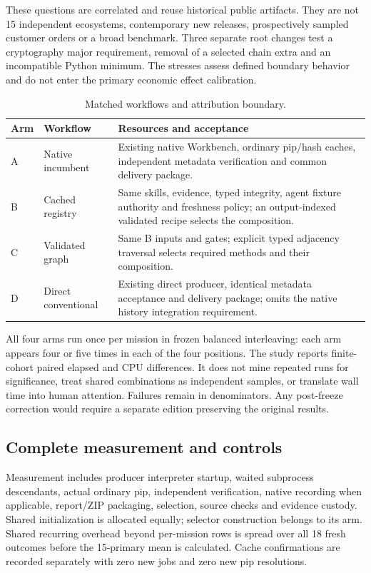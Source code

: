 \documentclass[11pt,a4paper]{article}
\begin{document}
These questions are correlated and reuse historical public artifacts. They are not 15 independent ecosystems, contemporary new releases, prospectively sampled customer orders or a broad benchmark. Three separate root changes test a cryptography major requirement, removal of a selected chain extra and an incompatible Python minimum. The stresses assess defined boundary behavior and do not enter the primary economic effect calibration.

\begin{table}[htbp]
\caption{Matched workflows and attribution boundary.}
\label{tab:arms}
\small
\begin{tabularx}{\linewidth}{L{10mm}L{37mm}Y}
\toprule Arm & Workflow & Resources and acceptance \\
\midrule
A & Native incumbent & Existing native Workbench, ordinary pip/hash caches, independent metadata verification and common delivery package. \\
B & Cached registry & Same skills, evidence, typed integrity, agent fixture authority and freshness policy; an output-indexed validated recipe selects the composition. \\
C & Validated graph & Same B inputs and gates; explicit typed adjacency traversal selects required methods and their composition. \\
D & Direct conventional & Existing direct producer, identical metadata acceptance and delivery package; omits the native history integration requirement. \\
\bottomrule
\end{tabularx}
\end{table}

All four arms run once per mission in frozen balanced interleaving: each arm appears four or five times in each of the four positions. The study reports finite-cohort paired elapsed and CPU differences. It does not mine repeated runs for significance, treat shared combinations as independent samples, or translate wall time into human attention. Failures remain in denominators. Any post-freeze correction would require a separate edition preserving the original results.

\subsection{Complete measurement and controls}
Measurement includes producer interpreter startup, waited subprocess descendants, actual ordinary pip, independent verification, native recording when applicable, report/ZIP packaging, selection, source checks and evidence custody. Shared initialization is allocated equally; selector construction belongs to its arm. Shared recurring overhead beyond per-mission rows is spread over all 18 fresh outcomes before the 15-primary mean is calculated. Cache confirmations are recorded separately with zero new jobs and zero new pip resolutions.
\end{document}
